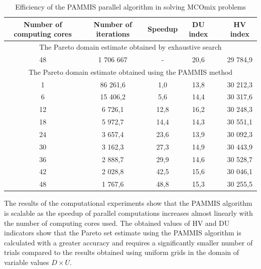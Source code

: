 \documentclass{svproc}
\begin{document}
\begin{table}[ht]
\centering
\caption{Efficiency of the PAMMIS parallel algorithm in solving MCOmix problems}
\label{tab:2}
\begin{tabular}{cccccc}
\hline
Number of computing cores    & Number of iterations    & Speedup  & DU index&   & HV index  \\\hline
\multicolumn{6}{c}{The   Pareto domain estimate obtained by exhaustive search}        \\\hline
48                           & 1 706 667               & -        & 20,6 & & 29 784,9  \\\hline
\multicolumn{6}{c}{The Pareto    domain  estimate obtained using the   PAMMIS method} \\\hline
1                            & 86 261,6                & 1,0      & 13,8 & & 30 212,3  \\
6                            & 15 406,2                & 5,6      & 14,4 & & 30 317,6  \\
12                           & 6 726,1                 & 12,8     & 16,2 & & 30 248,3  \\
18                           & 5 972,7                 & 14,4     & 14,3 & & 30 551,1  \\
24                           & 3 657,4                 & 23,6     & 13,9 & & 30 092,3  \\
30                           & 3 162,3                 & 27,3     & 14,9 & & 30 443,9  \\
36                           & 2 888,7                 & 29,9     & 14,6 & & 30 528,7  \\
42                           & 2 028,8                 & 42,5     & 15,6 & & 30 046,1  \\
48                           & 1 767,6                 & 48,8     & 15,3 & & 30 255,5 \\ \hline
\end{tabular}
\end{table}

The results of the computational experiments show that the PAMMIS algorithm is scalable as the  speedup of parallel computations increases almost linearly with the number of computing cores used. The obtained values of HV and DU indicators show that the Pareto set estimate using the PAMMIS algorithm is calculated with a greater accuracy and requires a significantly smaller number of trials compared to the results obtained using uniform grids in the domain of variable values $D \times U$.
\end{document}
